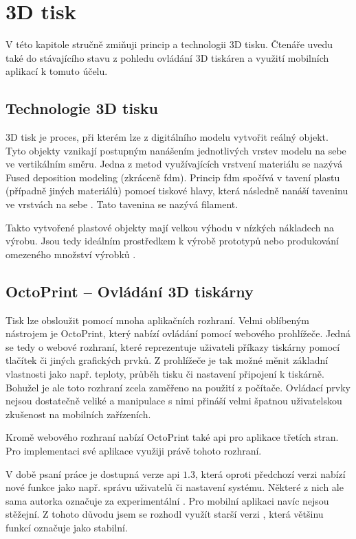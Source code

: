 \chapter{3D tisk}\label{3d-tisk}

V této kapitole stručně zmiňuji princip a technologii 3D tisku.
Čtenáře uvedu také do stávajícího stavu z pohledu ovládání 3D tiskáren a využití mobilních aplikací k tomuto účelu.

\section{Technologie 3D tisku}\label{3d-tisk-technologie}

3D tisk je proces, při kterém lze z digitálního modelu vytvořit reálný objekt.
Tyto objekty vznikají postupným nanášením jednotlivých vrstev modelu na sebe ve vertikálním směru.
Jedna z metod využívajících vrstvení materiálu se nazývá Fused deposition modeling (zkráceně \acrshort{fdm}).
Princip \acrshort{fdm} spočívá v tavení plastu (případně jiných materiálů) pomocí tiskové hlavy, která následně nanáší taveninu ve vrstvách na sebe \cite{3d-print-fdm}.
Tato tavenina se nazývá filament.

Takto vytvořené plastové objekty mají velkou výhodu v nízkých nákladech na výrobu.
Jsou tedy ideálním prostředkem k výrobě prototypů nebo produkování omezeného množství výrobků \cite{3d-print-for-prototyping}.

\section{OctoPrint -- Ovládání 3D tiskárny}\label{3d-tisk-ovladani}

Tisk lze obsloužit pomocí mnoha aplikačních rozhraní.
Velmi oblíbeným nástrojem je OctoPrint, který nabízí ovládání pomocí webového prohlížeče.
Jedná se tedy o webové rozhraní, které reprezentuje uživateli příkazy tiskárny pomocí tlačítek či jiných grafických prvků.
Z prohlížeče je tak možné měnit základní vlastnosti jako např. teploty, průběh tisku či nastavení připojení k tiskárně.
Bohužel je ale toto rozhraní zcela zaměřeno na použití z počítače.
Ovládací prvky nejsou dostatečně veliké a manipulace s nimi přináší velmi špatnou uživatelskou zkušenost na mobilních zařízeních.

Kromě webového rozhraní nabízí OctoPrint také \acrfull{api} pro aplikace třetích stran.
Pro implementaci své aplikace využiji právě tohoto rozhraní.

V době psaní práce je dostupná verze \acrshort{api} $1.3$, která oproti předchozí verzi nabízí nové funkce jako např. správu uživatelů či nastavení systému.
Některé z nich ale sama autorka označuje za experimentální \cite{octoprint-experimental-funcs}.
Pro mobilní aplikaci navíc nejsou stěžejní.
Z tohoto důvodu jsem se rozhodl využít starší verzi \vapi{}, která většinu funkcí označuje jako stabilní.

